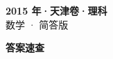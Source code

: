 \documentclass[zihao=-4, a4paper]{ctexart}
\begin{document}
\begin{center}
  {\Large\bfseries 2015 年·天津卷·理科}\\[4pt]
  {\large 数学 · 简答版}
\end{center}
\medskip
{}

\clearpage
{}
\begin{center}{\Large\bfseries 答案速查}\end{center}
\medskip

\end{document}
